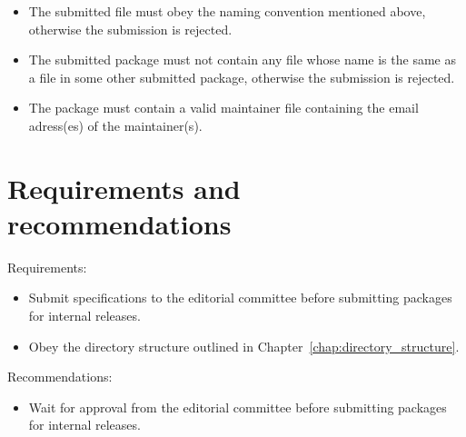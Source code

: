 {\begin{itemize}
\item The submitted file must obey the naming convention mentioned above,
      otherwise the submission is rejected.

\item The submitted package must not contain any file whose name is the same
      as a file in some other submitted package, otherwise the submission is
      rejected.

\item The package must contain a valid maintainer file containing the email
      adress(es) of the maintainer(s).

\end{itemize}


\section{Requirements and recommendations\label{sec:submission_req_and_rec}}

\noindent
Requirements:
\begin{itemize}
   \item Submit specifications to the editorial committee before submitting
         packages for internal releases.
   \item Obey the directory structure outlined in Chapter~\ref{chap:directory_structure}.
\end{itemize}

\noindent
Recommendations:
\begin{itemize}
    \item Wait for approval from the editorial committee before submitting packages
          for internal releases.
\end{itemize}
}

